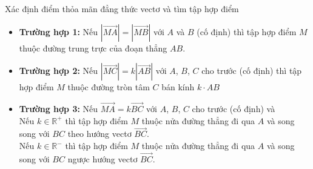 \begin{dang}{Xác định điểm thỏa mãn đẳng thức vectơ và tìm tập hợp điểm}
	\begin{itemize}
		\item {\bf Trường hợp 1:} Nếu $|\overrightarrow{MA}|=|\overrightarrow{MB}|$ với $A$ và $B$ (cố định) thì tập hợp điểm $M$ thuộc đường trung trực của đoạn thẳng $AB$.
		\item {\bf Trường hợp 2:} Nếu $|\overrightarrow{MC}|=k|\overrightarrow{AB}|$ với $A$, $B$, $C$ cho trước (cố định) thì tập hợp điểm $M$ thuộc đường tròn tâm $C$ bán kính $k\cdot AB$
		\item {\bf Trường hợp 3:}  Nếu $\overrightarrow{MA}=k\overrightarrow{BC}$  với $A$, $B$, $C$ cho trước (cố định) và \\
		Nếu $k\in\mathbb{R^+}$ thì tập hợp điểm $M$ thuộc nửa đường thẳng đi qua $A$ và song song với $BC$ theo hướng vectơ $\overrightarrow{BC}$.\\
		Nếu $k\in\mathbb{R^-}$ thì tập hợp điểm $M$ thuộc nửa đường thẳng đi qua $A$ và song song với $BC$ ngược hướng vectơ $\overrightarrow{BC}$.
	\end{itemize}
\end{dang}

